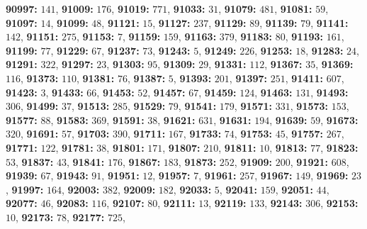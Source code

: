 \textsf{\bfseries 90997:} $141$, \textsf{\bfseries 91009:} $176$, \textsf{\bfseries 91019:} $771$, \textsf{\bfseries 91033:} $31$, \textsf{\bfseries 91079:} $481$, \textsf{\bfseries 91081:} $59$, \textsf{\bfseries 91097:} $14$, \textsf{\bfseries 91099:} $48$, \textsf{\bfseries 91121:} $15$, \textsf{\bfseries 91127:} $237$, \textsf{\bfseries 91129:} $89$, \textsf{\bfseries 91139:} $79$, \textsf{\bfseries 91141:} $142$, \textsf{\bfseries 91151:} $275$, \textsf{\bfseries 91153:} $7$, \textsf{\bfseries 91159:} $159$, \textsf{\bfseries 91163:} $379$, \textsf{\bfseries 91183:} $80$, \textsf{\bfseries 91193:} $161$, \textsf{\bfseries 91199:} $77$, \textsf{\bfseries 91229:} $67$, \textsf{\bfseries 91237:} $73$, \textsf{\bfseries 91243:} $5$, \textsf{\bfseries 91249:} $226$, \textsf{\bfseries 91253:} $18$, \textsf{\bfseries 91283:} $24$, \textsf{\bfseries 91291:} $322$, \textsf{\bfseries 91297:} $23$, \textsf{\bfseries 91303:} $95$, \textsf{\bfseries 91309:} $29$, \textsf{\bfseries 91331:} $112$, \textsf{\bfseries 91367:} $35$, \textsf{\bfseries 91369:} $116$, \textsf{\bfseries 91373:} $110$, \textsf{\bfseries 91381:} $76$, \textsf{\bfseries 91387:} $5$, \textsf{\bfseries 91393:} $201$, \textsf{\bfseries 91397:} $251$, \textsf{\bfseries 91411:} $607$, \textsf{\bfseries 91423:} $3$, \textsf{\bfseries 91433:} $66$, \textsf{\bfseries 91453:} $52$, \textsf{\bfseries 91457:} $67$, \textsf{\bfseries 91459:} $124$, \textsf{\bfseries 91463:} $131$, \textsf{\bfseries 91493:} $306$, \textsf{\bfseries 91499:} $37$, \textsf{\bfseries 91513:} $285$, \textsf{\bfseries 91529:} $79$, \textsf{\bfseries 91541:} $179$, \textsf{\bfseries 91571:} $331$, \textsf{\bfseries 91573:} $153$, \textsf{\bfseries 91577:} $88$, \textsf{\bfseries 91583:} $369$, \textsf{\bfseries 91591:} $38$, \textsf{\bfseries 91621:} $631$, \textsf{\bfseries 91631:} $194$, \textsf{\bfseries 91639:} $59$, \textsf{\bfseries 91673:} $320$, \textsf{\bfseries 91691:} $57$, \textsf{\bfseries 91703:} $390$, \textsf{\bfseries 91711:} $167$, \textsf{\bfseries 91733:} $74$, \textsf{\bfseries 91753:} $45$, \textsf{\bfseries 91757:} $267$, \textsf{\bfseries 91771:} $122$, \textsf{\bfseries 91781:} $38$, \textsf{\bfseries 91801:} $171$, \textsf{\bfseries 91807:} $210$, \textsf{\bfseries 91811:} $10$, \textsf{\bfseries 91813:} $77$, \textsf{\bfseries 91823:} $53$, \textsf{\bfseries 91837:} $43$, \textsf{\bfseries 91841:} $176$, \textsf{\bfseries 91867:} $183$, \textsf{\bfseries 91873:} $252$, \textsf{\bfseries 91909:} $200$, \textsf{\bfseries 91921:} $608$, \textsf{\bfseries 91939:} $67$, \textsf{\bfseries 91943:} $91$, \textsf{\bfseries 91951:} $12$, \textsf{\bfseries 91957:} $7$, \textsf{\bfseries 91961:} $257$, \textsf{\bfseries 91967:} $149$, \textsf{\bfseries 91969:} $23$, \textsf{\bfseries 91997:} $164$, \textsf{\bfseries 92003:} $382$, \textsf{\bfseries 92009:} $182$, \textsf{\bfseries 92033:} $5$, \textsf{\bfseries 92041:} $159$, \textsf{\bfseries 92051:} $44$, \textsf{\bfseries 92077:} $46$, \textsf{\bfseries 92083:} $116$, \textsf{\bfseries 92107:} $80$, \textsf{\bfseries 92111:} $13$, \textsf{\bfseries 92119:} $133$, \textsf{\bfseries 92143:} $306$, \textsf{\bfseries 92153:} $10$, \textsf{\bfseries 92173:} $78$, \textsf{\bfseries 92177:} $725$, 
